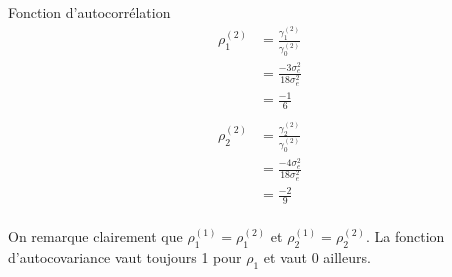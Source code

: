 \documentclass{article}
\begin{document}
\begin{enumerate}
   Fonction d'autocorrélation
   \begin{align*}
     \rho_1^{(2)} &= \frac{\gamma_1^{(2)}}{\gamma_0^{(2)}} \\
     &= \frac{-3\sigma^2_e}{18\sigma^2_e} \\
     &= \frac{-1}{6} \\
   \end{align*}
   \begin{align*}
     \rho_2^{(2)} &= \frac{\gamma_2^{(2)}}{\gamma_0^{(2)}} \\
     &= \frac{-4\sigma^2_e}{18\sigma^2_e} \\
     &= \frac{-2}{9} \\
   \end{align*}
 \end{enumerate}
 
 On remarque clairement que $\rho_1^{(1)} = \rho_1^{(2)}$ et $\rho_2^{(1)} = \rho_2^{(2)}$. 
 La fonction d'autocovariance vaut toujours 1 pour $\rho_1$ et vaut 0 ailleurs.
 
 \clearpage
 
 
\end{document}
